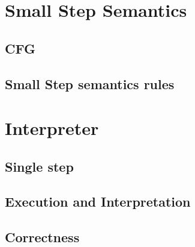 \section{Small Step Semantics}

\subsection{CFG}
\subsection{Small Step semantics rules}

\section{Interpreter}

\subsection{Single step}
\subsection{Execution and Interpretation}
\subsection{Correctness}

